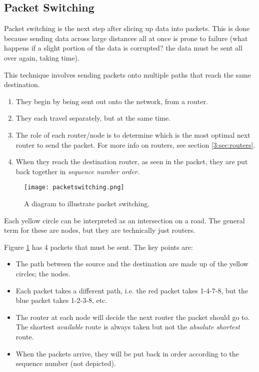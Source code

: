 \documentclass[../main.tex]{subfiles}
\begin{document}
\subsection{Packet Switching}

Packet switching is the next step after slicing up data into packets. This is done because sending data across large distances all at once is prone to failure (what happens if a slight portion of the data is corrupted? the data must be sent all over again, taking time). 

This technique involves sending packets onto multiple paths that reach the same destination.

\begin{enumerate}
    \item They begin by being sent out onto the network, from a router.
    \item They each travel separately, but at the same time.
    \item The role of each router/node is to determine which is the most optimal next router to send the packet. For more info on routers, see section \ref{3:sec:routers}. 
    \item When they reach the destination router, as seen in the packet, they are put back together in \emph{sequence number order.}
\end{enumerate}

\begin{figure}[h]
    \centering
    \texttt{[image: packetswitching.png]}
    \caption{A diagram to illustrate packet switching.}
    \label{fig:packetswitching}
\end{figure}

Each yellow circle can be interpreted as an intersection on a road. The general term for these are nodes, but they are technically just routers.

Figure \ref{fig:packetswitching} has 4 packets that must be sent. The key points are:

\begin{itemize}
    \item The path between the source and the destination are made up of the yellow circles; the nodes.
    \item Each packet takes a different path, i.e. the red packet takes 1-4-7-8, but the blue packet takes 1-2-3-8, etc.
    \item The router at each node will decide the next router the packet should go to. The shortest \emph{available} route is always taken but not the \emph{absolute shortest} route.
    \item When the packets arrive, they will be put back in order according to the sequence number (not depicted).
\end{itemize}
\end{document}
